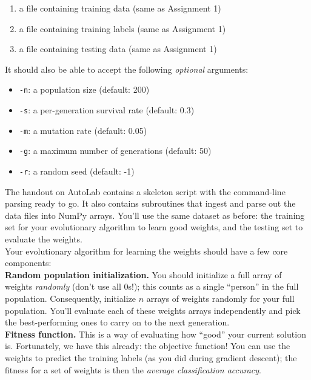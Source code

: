 \documentclass[paper=a4, fontsize=11pt]{scrartcl} %
\numberwithin{figure}{section} %
\numberwithin{table}{section} %
\begin{document}
\begin{enumerate}
	\item a file containing training data (same as Assignment 1)
	\item a file containing training labels (same as Assignment 1)
	\item a file containing testing data (same as Assignment 1)
\end{enumerate}

It should also be able to accept the following \emph{optional} arguments:

\begin{itemize}
	\item \texttt{-n}: a population size (default: 200)
	\item \texttt{-s}: a per-generation survival rate (default: 0.3)
	\item \texttt{-m}: a mutation rate (default: 0.05)
	\item \texttt{-g}: a maximum number of generations (default: 50)
	\item \texttt{-r}: a random seed (default: -1)
\end{itemize}

The handout on AutoLab contains a skeleton script with the command-line parsing ready to go. It also contains subroutines that ingest and parse out the data files into NumPy arrays. You'll use the same dataset as before: the training set for your evolutionary algorithm to learn good weights, and the testing set to evaluate the weights. \\

Your evolutionary algorithm for learning the weights should have a few core components: \\

\textbf{Random population initialization.} You should initialize a full array of weights \emph{randomly} (don't use all 0s!); this counts as a single ``person'' in the full population. Consequently, initialize $n$ arrays of weights randomly for your full population. You'll evaluate each of these weights arrays independently and pick the best-performing ones to carry on to the next generation. \\

\textbf{Fitness function.} This is a way of evaluating how ``good'' your current solution is. Fortunately, we have this already: the objective function! You can use the weights to predict the training labels (as you did during gradient descent); the fitness for a set of weights is then the \emph{average classification accuracy}. \\
\end{document}
